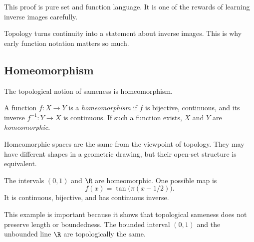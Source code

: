 This proof is pure set and function language. It is one of the rewards of
learning inverse images carefully.

\begin{focusbox}
Topology turns continuity into a statement about inverse images. This is why
early function notation matters so much.
\end{focusbox}

\subsection{Homeomorphism}

The topological notion of sameness is homeomorphism.

\begin{definition}
A function $f:X\to Y$ is a \emph{homeomorphism} if $f$ is bijective, continuous,
and its inverse $f^{-1}:Y\to X$ is continuous. If such a function exists, $X$
and $Y$ are \emph{homeomorphic}.
\end{definition}

Homeomorphic spaces are the same from the viewpoint of topology. They may have
different shapes in a geometric drawing, but their open-set structure is
equivalent.

\begin{example}
The intervals $(0,1)$ and $\R$ are homeomorphic. One possible map is
\[
f(x)=\tan\bigl(\pi(x-1/2)\bigr).
\]
It is continuous, bijective, and has continuous inverse.
\end{example}

This example is important because it shows that topological sameness does not
preserve length or boundedness. The bounded interval $(0,1)$ and the unbounded
line $\R$ are topologically the same.

\begin{center}
\end{center}

